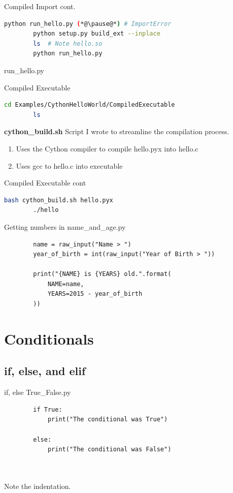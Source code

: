 \documentclass[11pt]{beamer}
\newcommand{\emptyline}{$ $\\}
\begin{document}
\begin{frame}[fragile]{Compiled Import cont.}
	\begin{lstlisting}[language=Bash]
		python run_hello.py (*@\pause@*) # ImportError
		python setup.py build_ext --inplace
		ls  # Note hello.so
		python run_hello.py
	\end{lstlisting}
	
	run\_hello.py
	
\end{frame}

\begin{frame}[fragile]{Compiled Executable}
	\begin{lstlisting}[language=Bash]
		cd Examples/CythonHelloWorld/CompiledExecutable
		ls	
	\end{lstlisting}
	
	\begin{flushleft}
		\textbf{cython\_build.sh} Script I wrote to streamline the compilation process. 
		\begin{enumerate}
			\item Uses the Cython compiler to compile hello.pyx into hello.c
			\item Uses gcc to hello.c into executable
		\end{enumerate}
	\end{flushleft}
\end{frame}

\begin{frame}[fragile]{Compiled Executable cont}
	\begin{lstlisting}[language=Bash]
		bash cython_build.sh hello.pyx
		./hello
	\end{lstlisting}
\end{frame}

\begin{frame}[fragile]{Getting numbers in}
	name\_and\_age.py
	\begin{lstlisting}
		name = raw_input("Name > ")
		year_of_birth = int(raw_input("Year of Birth > "))
		
		print("{NAME} is {YEARS} old.".format(
		    NAME=name,
		    YEARS=2015 - year_of_birth		
		))
	\end{lstlisting}
\end{frame}

\section{Conditionals}
\subsection{if, else, and elif}
\begin{frame}[fragile]{if, else}
	True\_False.py
	\begin{lstlisting}
		if True:
		    print("The conditional was True")
		
		else:
		    print("The conditional was False")
	\end{lstlisting}
	\emptyline
	\emptyline
	\pause
	Note the indentation.
\end{frame}
\end{document}
